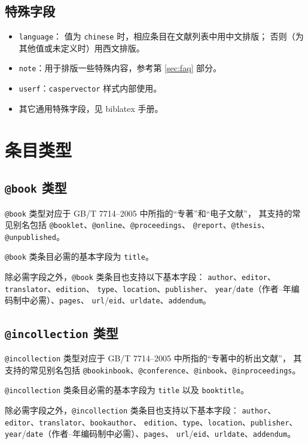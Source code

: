 \documentclass[UTF8]{ctexart}
\begin{document}
\subsection{特殊字段}

\begin{itemize}
	\item \verb|language|：
		值为 \verb|chinese| 时，相应条目在文献列表中用中文排版；
		否则（为其他值或未定义时）用西文排版。
	\item \verb|note|：用于排版一些特殊内容，参考第 \ref{sec:faq} 部分。
	\item \verb|userf|：\verb|caspervector| 样式内部使用。
	\item 其它通用特殊字段，见 biblatex 手册\supercite{biblatex}。
\end{itemize}

\section{条目类型}\label{sec:entries}
\subsection{\texttt{@book} 类型}

\verb|@book| 类型对应于 GB/T 7714--2005 中所指的“专著”和“电子文献”，
其支持的常见别名包括 \verb|@booklet|、\verb|@online|、\verb|@proceedings|、%
\verb|@report|、\verb|@thesis|、\verb|@unpublished|。

\verb|@book| 类条目必需的基本字段为 \verb|title|。

除必需字段之外，\verb|@book| 类条目也支持以下基本字段：%
\verb|author|、\verb|editor|、\verb|translator|、\verb|edition|、%
\verb|type|、\verb|location|、\verb|publisher|、%
\verb|year|/\verb|date|（作者--年编码制中必需）、\verb|pages|、%
\verb|url|/\verb|eid|、\verb|urldate|、\verb|addendum|。

\subsection{\texttt{@incollection} 类型}

\verb|@incollection| 类型对应于 GB/T 7714--2005 中所指的“专著中的析出文献”，
其支持的常见别名包括
\verb|@bookinbook|、\verb|@conference|、\verb|@inbook|、\verb|@inproceedings|。

\verb|@incollection| 类条目必需的基本字段为 \verb|title| 以及 \verb|booktitle|。

除必需字段之外，\verb|@incollection| 类条目也支持以下基本字段：%
\verb|author|、\verb|editor|、\verb|translator|、\verb|bookauthor|、%
\verb|edition|、\verb|type|、\verb|location|、\verb|publisher|、%
\verb|year|/\verb|date|（作者--年编码制中必需）、\verb|pages|、%
\verb|url|/\verb|eid|、\verb|urldate|、\verb|addendum|。
\end{document}
